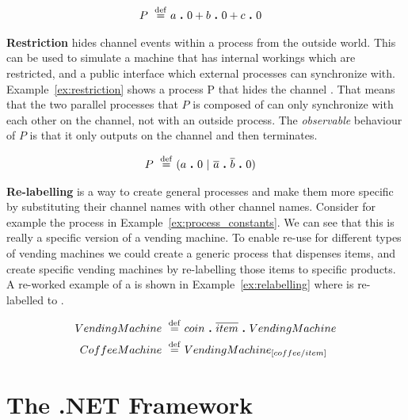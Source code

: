 	\begin{Exa}\label{ex:process_constants}
	\begin{align*}
			P \ \stackrel{\mathrm{def}}{=}\  & a \ \textbf{.}\  0 + b \ \textbf{.}\  0 + c \ \textbf{.}\  0
	\end{align*}	
	\end{Exa}
	
	\textbf{Restriction} hides channel events within a process from the outside 
	world. This can be used to simulate a machine that has internal workings 
	which are restricted, and a public interface which external processes can	
	synchronize with. Example~\ref{ex:restriction} shows a process P that hides 
	the channel . That means that the two parallel processes that $P$ 
	is composed of can only synchronize with each other on the  
	channel, not with an outside process. The \textit{observable} behaviour of 
	$P$ is that it only outputs on the  channel and then terminates.
	
	\begin{Exa}\label{ex:restriction}
	\begin{align*}
			P \ \stackrel{\mathrm{def}}{=}\  & (a \ \textbf{.}\  0 \ |\  \overline{a} \ \textbf{.}\  \overline{b} \ \textbf{.}\  0)  			
	\end{align*}	
	\end{Exa}

	\textbf{Re-labelling} is a way to create general processes and make them 
	more specific by substituting their channel names with other channel names. 
	Consider for example the  process in 
	Example~\ref{ex:process_constants}. We can see that this is really a 
	specific version of a vending machine. To enable re-use for different types 
	of vending machines we could create a generic  process 
	that dispenses items, and create specific vending machines by re-labelling 
	those items to specific products. A re-worked example of a 
	 is shown in Example~\ref{ex:relabelling} where 
	 is re-labelled to .
	
	\begin{Exa}\label{ex:relabelling}
	\begin{align*}
			VendingMachine \ \stackrel{\mathrm{def}}{=}\  & coin \ \textbf{.}\  \overline{item} \ \textbf{.}\  VendingMachine \\
			CoffeeMachine \ \stackrel{\mathrm{def}}{=}\  & VendingMachine_{[coffee/item]}
	\end{align*}	
	\end{Exa}
	
	
\section{The .NET Framework}

